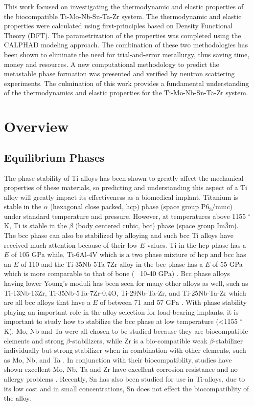 This work focused on investigating the thermodynamic and elastic properties of the biocompatible Ti-Mo-Nb-Sn-Ta-Zr system. The thermodynamic and elastic properties were calculated using first-principles based on Density Functional Theory (DFT). The parametrization of the properties was completed using the CALPHAD modeling approach. The combination of these two methodologies has been shown to eliminate the need for trial-and-error metallurgy, thus saving time, money and resources. A new computational methodology to predict the metastable phase formation was presented and verified by neutron scattering experiments. The culmination of this work provides a fundamental understanding of the thermodynamics and elastic properties for the Ti-Mo-Nb-Sn-Ta-Zr system. 


\section{Overview}

\subsection{Equilibrium Phases}

The phase stability of Ti alloys has been shown to greatly affect the mechanical properties of these materials, so predicting and understanding this aspect of a Ti alloy will greatly impact its effectiveness as a biomedical implant. Titanium is stable in the $\alpha$ (hexagonal close packed, hcp) phase (space group P$6_{3}/$mmc) under standard temperature and pressure. However, at temperatures above 1155 $^{\circ}$K, Ti is stable in the $\beta$ (body centered cubic, bcc) phase (space group Im$\overline{3}$m). The bcc phase can also be stabilized by alloying and such bcc Ti alloys have received much attention because of their low $E$ values. Ti in the hcp phase has a $E$ of 105 GPa while, Ti-6Al-4V which is a two phase mixture of hcp and bcc has an $E$ of 110 and the Ti-35Nb-5Ta-7Zr alloy in the bcc phase has a $E$ of 55 GPa which is more comparable to that of bone (~ 10-40 GPa) \cite{Long1998a,Jain2013,Antolin2012,Mei2011,Brailovski2011b}. Bcc phase alloys having lower Young's moduli has been seen for many other alloys as well, such as Ti-13Nb-13Zr, Ti-35Nb-5Ta-7Zr-0.4O, Ti-29Nb-Ta-Zr, and Ti-25Nb-Ta-Zr which are all bcc alloys that have a $E$ of between 71 and 57 GPa \cite{Long1998a,Tane2008a,Tane2010a}. With phase stability playing an important role in the alloy selection for load-bearing implants, it is important to study how to stabilize the bcc phase at low temperature (<1155 $^{\circ}$K). Mo, Nb and Ta were all chosen to be studied because they are biocompatible elements and strong $\beta$-stabilizers, while Zr is a bio-compatible weak $\beta$-stabilizer individually but strong stabilizer when in combination with other elements, such as Mo, Nb, and Ta \cite{Long1998a}. In conjunction with their biocompatiblity, studies have shown excellent Mo, Nb, Ta and Zr have excellent corrosion resistance and no allergy problems \cite{Tane2008a}. Recently, Sn has also been studied for use in Ti-alloys, due to its low cost \cite{Niinomi2012} and in small concentrations, Sn does not effect the biocompatiblity of the alloy. 

